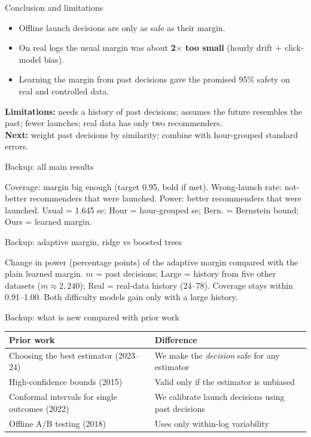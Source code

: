 \documentclass[aspectratio=169,11pt]{beamer}
\begin{document}
\begin{frame}{Conclusion and limitations}
\begin{itemize}
  \item Offline launch decisions are only as safe as their margin.
  \item On real logs the usual margin was about \textbf{2$\times$ too small} (hourly drift + click-model bias).
  \item Learning the margin from past decisions gave the promised 95\% safety on real and controlled data.
\end{itemize}
\vspace{0.5em}
\textbf{Limitations:} needs a history of past decisions; assumes the future resembles the past; fewer launches; real data has only two recommenders.\\[0.3em]
\textbf{Next:} weight past decisions by similarity; combine with hour-grouped standard errors.
\end{frame}

\begin{frame}{Backup: all main results}
\centering
\resizebox{\textwidth}{!}{}

\vspace{0.6em}
\raggedright
\footnotesize Coverage: margin big enough (target 0.95, bold if met). Wrong-launch rate: not-better recommenders that were launched. Power: better recommenders that were launched. Usual = 1.645 se; Hour = hour-grouped se; Bern. = Bernstein bound; Ours = learned margin.
\end{frame}

\begin{frame}{Backup: adaptive margin, ridge vs boosted trees}
\centering
\small


\vspace{0.6em}
\raggedright
\footnotesize Change in power (percentage points) of the adaptive margin compared with the plain learned margin. $m$ = past decisions; Large = history from five other datasets ($m\approx2{,}240$); Real = real-data history (24--78). Coverage stays within 0.91--1.00. Both difficulty models gain only with a large history.
\end{frame}

\begin{frame}{Backup: what is new compared with prior work}
\small
\begin{tabular}{p{}p{}}
\toprule
Prior work & Difference \\
\midrule
Choosing the best estimator (2023--24) & We make the \emph{decision} safe for any estimator \\
High-confidence bounds (2015) & Valid only if the estimator is unbiased \\
Conformal intervals for single outcomes (2022) & We calibrate launch decisions using past decisions \\
Offline A/B testing (2018) & Uses only within-log variability \\
\bottomrule
\end{tabular}
\end{frame}
\end{document}
